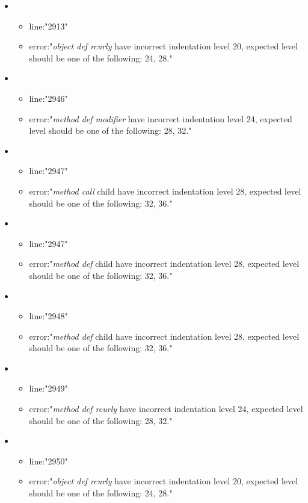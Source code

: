 \begin{itemize}
\begin{itemize}
	\end{itemize}
	\item 
	\begin{itemize} 
		\item line:"2913" 
		\item error:"\emph{object def rcurly} have incorrect indentation level 20, expected level should be one of the following: 24, 28." 
	\end{itemize}
	\item 
	\begin{itemize} 
		\item line:"2946" 
		\item error:"\emph{method def modifier} have incorrect indentation level 24, expected level should be one of the following: 28, 32." 
	\end{itemize}
	\item 
	\begin{itemize} 
		\item line:"2947" 
		\item error:"\emph{method call} child have incorrect indentation level 28, expected level should be one of the following: 32, 36." 
	\end{itemize}
	\item 
	\begin{itemize} 
		\item line:"2947" 
		\item error:"\emph{method def} child have incorrect indentation level 28, expected level should be one of the following: 32, 36." 
	\end{itemize}
	\item 
	\begin{itemize} 
		\item line:"2948" 
		\item error:"\emph{method def} child have incorrect indentation level 28, expected level should be one of the following: 32, 36." 
	\end{itemize}
	\item 
	\begin{itemize} 
		\item line:"2949" 
		\item error:"\emph{method def rcurly} have incorrect indentation level 24, expected level should be one of the following: 28, 32." 
	\end{itemize}
	\item 
	\begin{itemize} 
		\item line:"2950" 
		\item error:"\emph{object def rcurly} have incorrect indentation level 20, expected level should be one of the following: 24, 28." 

\end{itemize}
\end{itemize}
